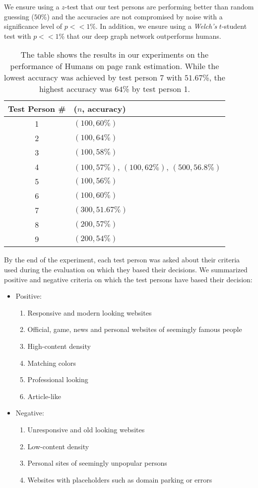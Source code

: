 We ensure using a $z$-test that our test persons are performing better than random guessing ($50$\%) and the accuracies are not compromised by noise with a significance level of $p << 1$\%. In addition, we ensure using a \textit{Welch's} $t$-student test with $p << 1$\% that our deep graph network outperforms humans.

\begin{table}[]
	\center
	\begin{tabular}{c||l}
		Test Person \#  & ($n$, accuracy)\\ \hline \hline
		1 &  $(100, 60\%)$ \\ \hline
		2 &  $(100, 64\%)$\\ \hline
		3 &  $(100, 58\%)$\\ \hline
		4 &  $(100, 57\%)$, $(100, 62\%)$, $(500, 56.8\%)$\\ \hline
		5 &  $(100, 56\%)$\\ \hline
		6 &  $(100, 60\%)$\\ \hline
		7 &  $(300, 51.67\%)$\\ \hline
		8 &  $(200, 57\%)$\\ \hline
		9 &  $(200, 54\%)$\\
	\end{tabular}
	\caption[Results of Human Performance on Page Rank Estimation]{The table shows the results in our experiments on the performance of Humans on page rank estimation. While the lowest accuracy was achieved by test person 7 with $51.67$\%, the highest accuracy was $64$\% by test person 1.}
\label{table_human_eval_results}
\end{table}

By the end of the experiment, each test person was asked about their criteria used during the evaluation on which they based their decisions. We summarized positive and negative criteria on which the test persons have based their decision:

\begin{itemize}
	\item Positive: \begin{enumerate}
	 \item Responsive and modern looking websites
	 \item Official, game, news and personal websites of seemingly famous people
	 \item High-content density
	 \item Matching colors
	 \item Professional looking
	 \item Article-like
	\end{enumerate}
	\item Negative: \begin{enumerate}
	\item Unresponsive and old looking websites
	\item Low-content density
	\item Personal sites of seemingly unpopular persons
	\item Websites with placeholders such as domain parking or errors
	\end{enumerate}
\end{itemize}

